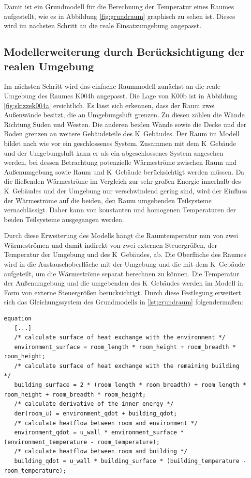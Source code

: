 Damit ist ein Grundmodell für die Berechnung der Temperatur eines Raumes aufgestellt, wie es in Abbildung \ref{fig:grundraum} graphisch zu sehen ist. Dieses wird im nächsten Schritt an die reale Einsatzumgebung angepasst.


\subsection{Modellerweiterung durch Berücksichtigung der realen Umgebung}

Im nächsten Schritt wird das einfache Raummodell zunächst an die reale Umgebung des Raumes K004b angepasst. Die Lage von K00b ist in Abbildung \ref{fig:skizzek004a} ersichtlich. Es lässt sich erkennen, dass der Raum zwei Außenwände besitzt, die an Umgebungsluft grenzen. Zu diesen zählen die Wände Richtung Süden und Westen. Die anderen beiden Wände sowie die Decke und der Boden grenzen an weitere Gebäudeteile des K~Gebäudes. Der Raum im Modell bildet nach wie vor ein geschlossenes System. Zusammen mit dem K~Gebäude und der Umgebungsluft kann er als ein abgeschlossenes System angesehen werden, bei dessen Betrachtung potenzielle Wärmeströme zwischen Raum und Außenumgebung sowie Raum und K~Gebäude berücksichtigt werden müssen. Da die fließenden Wärmeströme im Vergleich zur sehr großen Energie innerhalb des K~Gebäudes und der Umgebung nur verschwindend gering sind, wird der Einfluss der Wärmeströme auf die beiden, den Raum umgebenden Teilsysteme vernachlässigt. Daher kann von konstanten und homogenen Temperaturen der beiden Teilsysteme ausgegangen werden.

Durch diese Erweiterung des Modells hängt die Raumtemperatur nun von zwei Wärmeströmen und damit indirekt von zwei externen Steuergrößen, der Temperatur der Umgebung und des K~Gebäudes, ab. Die Oberfläche des Raumes wird in die Austauschoberfläche mit der Umgebung und die mit dem K~Gebäude aufgeteilt, um die Wärmeströme separat berechnen zu können. Die Temperatur der Außenumgebung und die umgebenden des K~Gebäudes werden im Modell in Form von externe Steuergrößen berücksichtigt. Durch diese Festlegung erweitert sich das Gleichungssystem des Grundmodells in \ref{lst:grundraum} folgendermaßen:
\begin{lstlisting}[language=Modelica, caption={Erweitertes Gleichungssystem Modell des Raumes unter Berücksichtigung der realen Umgebung in Modelica}, label=lst:raumeins]
equation
   [...]
   /* calculate surface of heat exchange with the environment */
   environment_surface = room_length * room_height + room_breadth * room_height;
   /* calculate surface of heat exchange with the remaining building */
   building_surface = 2 * (room_length * room_breadth) + room_length * room_height + room_breadth * room_height;
   /* calculate derivative of the inner energy */
   der(room_u) = environment_qdot + building_qdot;
   /* calculate heatflow between room and environment */
   environment_qdot = u_wall * environment_surface * (environment_temperature - room_temperature);
   /* calculate heatflow between room and building */
   building_qdot = u_wall * building_surface * (building_temperature - room_temperature);
\end{lstlisting}

